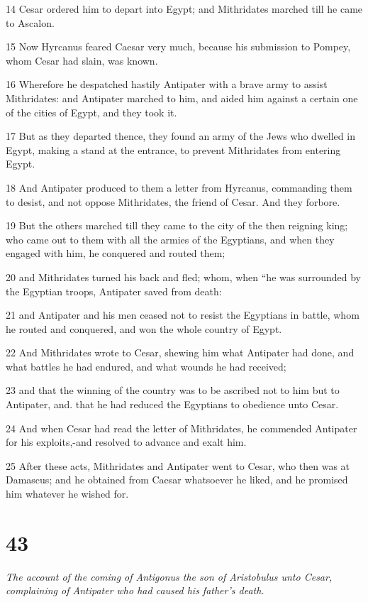 14 Cesar ordered him to depart into Egypt; and Mithridates marched till he came to Ascalon. 

15 Now Hyrcanus feared Caesar very much, because his submission to Pompey, whom Cesar had slain, was known. 

16 Wherefore he despatched hastily Antipater with a brave army to assist Mithridates: and Antipater marched to him, and aided him against a certain one of the cities of Egypt, and they took it. 

17 But as they departed thence, they found an army of the Jews who dwelled in Egypt, making a stand at the entrance, to prevent Mithridates from entering Egypt. 

18 And Antipater produced to them a letter from Hyrcanus, commanding them to desist, and not oppose Mithridates, the friend of Cesar. And they forbore. 

19 But the others marched till they came to the city of the then reigning king; who came out to them with all the armies of the Egyptians, and when they engaged with him, he conquered and routed them; 

20 and Mithridates turned his back and fled; whom, when “he was surrounded by the Egyptian troops, Antipater saved from death: 

21 and Antipater and his men ceased not to resist the Egyptians in battle, whom he routed and conquered, and won the whole country of Egypt. 

22 And Mithridates wrote to Cesar, shewing him what Antipater had done, and what battles he had endured, and what wounds he had received; 

23 and that the winning of the country was to be ascribed not to him but to Antipater, and. that he had reduced the Egyptians to obedience unto Cesar. 

24 And when Cesar had read the letter of Mithridates, he commended Antipater for his exploits,-and resolved to advance and exalt him. 

25 After these acts, Mithridates and Antipater went to Cesar, who then was at Damascus; and he obtained from Caesar whatsoever he liked, and he promised him whatever he wished for. 

\chapter{43}

\par \textit{The account of the coming of Antigonus the son of Aristobulus unto Cesar, complaining of Antipater who had caused his father’s death.}

